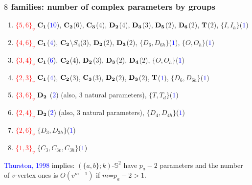 \documentclass{beamer}
\begin{document}
\begin{frame}
\frametitle{$8$ families: number of complex parameters by groups}
\vspace{-1.5mm}

\begin{enumerate}
\item
\textcolor{red}{$\{5,6\}_v$}
${\bf C_1}$(\textcolor{blue}{{\bf $10$}}),  ${\bf C_2}$($6$), ${\bf C_3}$($4$),  ${\bf D_2}$($4$),  
${\bf D_3}$($3$), ${\bf
D_5}$($2$),  ${\bf D_6}$($2$), ${\bf T}$($2$),  $\{I,I_h\}$(\textcolor{blue}{{\bf $1$}})
\item
\textcolor{red}{$\{4,6\}_v$} ${\bf 
C_1}$(\textcolor{blue}{{\bf $4$}}),
${\bf C_2}$$\setminus$$ S_{4}$($3$), ${\bf D_2}$($2$), ${\bf D_3}$($2$),  $\{D_6,D_{6h}\}$(\textcolor{blue}{{\bf $1$}}), 
$\{O,O_h\}$(\textcolor{blue}{{\bf $1$}})
\item
\textcolor{red}{$\{3, 4\}_v$} ${\bf 
C_{1}}$(\textcolor{blue}{{\bf $6$}}),
${\bf C_2}$($4$),  ${\bf D_2}$($3$),
${\bf D_3}$($2$), ${\bf D_4}$($2$), $\{O,O_h\}$(\textcolor{blue}{{\bf $1$}})
\item
\textcolor{red}{$\{2, 3\}_v$}  
${\bf C_1}$(\textcolor{blue}{{\bf $4$}}),
${\bf C_2}$($3$), ${\bf C_3}$($3$), ${\bf D_2}$($2$), ${\bf 
D_3}$($2$), ${\bf T}$(\textcolor{blue}{{\bf $1$}}),  
$\{D_6,D_{6h}\}$(\textcolor{blue}{{\bf $1$}})

\item  
\textcolor{red}{$\{3,6\}_v$} 
${\bf D_{2}}$ (\textcolor{blue}{$2$}) 
(also, $3$ natural parameters),
$\{T,T_d\}$(\textcolor{blue}{{\bf $1$}})
\item  
\textcolor{red}{$\{2, 4\}_v$} ${\bf 
D_2}$(\textcolor{blue}{{\bf $2$}}) (also, $3$ natural parameters),
$\{D_4,D_{4h}\}$(\textcolor{blue}{{\bf $1$}})

\item
\textcolor{red}{$\{2, 6\}_v$} 
$\{D_3,D_{3h}\}$(\textcolor{blue}{{\bf $1$}})
\item
\textcolor{red}{$\{1, 3\}_v$} 
$\{C_{3},C_{3v},C_{3h}\}$(\textcolor{blue}{{\bf $1$}})

\end{enumerate}
\textcolor{blue}{Thurston, 1998} implies: $(\{a,b\};k)$-$\mathbb{S}^2$ 
 have $p_{a}-2$ parameters and the number of $ v$-vertex ones is 
$O(v^{m-1})$ if $m$=$p_a-2>1$.

\end{frame}
\end{document}
